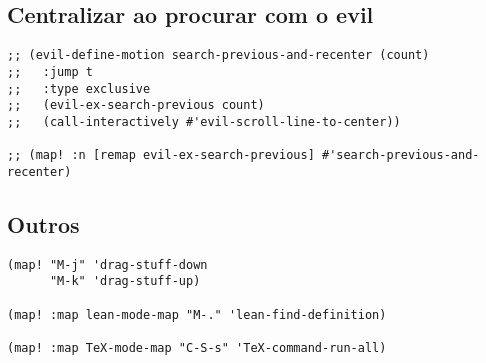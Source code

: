 \documentclass[11pt]{article}
\begin{document}
\subsection{Centralizar ao procurar com o evil}
\label{sec:org7e7e23a}
\begin{verbatim}
;; (evil-define-motion search-previous-and-recenter (count)
;;   :jump t
;;   :type exclusive
;;   (evil-ex-search-previous count)
;;   (call-interactively #'evil-scroll-line-to-center))

;; (map! :n [remap evil-ex-search-previous] #'search-previous-and-recenter)
\end{verbatim}

\subsection{Outros}
\label{sec:orgd66ba59}

\begin{verbatim}
(map! "M-j" 'drag-stuff-down
      "M-k" 'drag-stuff-up)

(map! :map lean-mode-map "M-." 'lean-find-definition)

(map! :map TeX-mode-map "C-S-s" 'TeX-command-run-all)
\end{verbatim}
\end{document}
